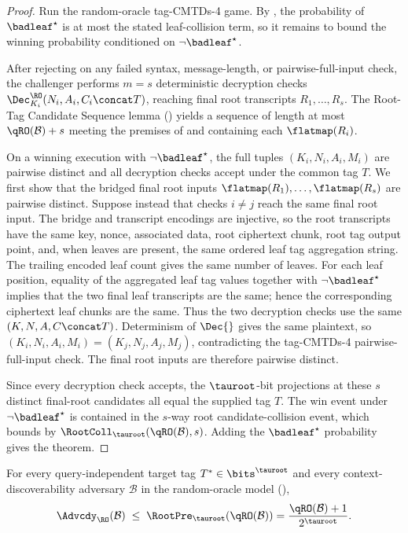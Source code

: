 \begin{proof}
Run the random-oracle tag-CMTDs-4 game. By
, the probability of
$\badleaf^\star$ is at most the stated leaf-collision term, so it
remains to bound the winning probability conditioned on
$\neg\badleaf^\star$.

After rejecting on any failed syntax, message-length, or
pairwise-full-input check, the challenger performs $m = s$ deterministic
decryption checks $\Dec_{K_i}^{\RO}(N_i,A_i,C_i \concat T)$, reaching
final root transcripts $R_1,\dots,R_s$. The Root-Tag Candidate Sequence
lemma () yields a sequence of length at most
$\qRO(\mathcal{B})+s$ meeting the premises of
 and containing each
$\flatmap(R_i)$.

On a winning execution with $\neg\badleaf^\star$, the full tuples
$(K_i,N_i,A_i,M_i)$ are pairwise distinct and all decryption checks
accept under the common tag $T$. We first show that the bridged final
root inputs $\flatmap(R_1),\dots,\flatmap(R_s)$ are pairwise distinct.
Suppose instead that checks $i \neq j$ reach the same final root input.
The bridge and transcript encodings are injective, so the root
transcripts have the same key, nonce, associated data, root ciphertext
chunk, root tag output point, and, when leaves are present, the same
ordered leaf tag aggregation string. The trailing encoded leaf count
gives the same number of leaves. For each leaf position, equality of the
aggregated leaf tag values together with $\neg\badleaf^\star$ implies
that the two final leaf transcripts are the same; hence the
corresponding ciphertext leaf chunks are the same. Thus the two
decryption checks use the same $(K,N,A,C\concat T)$. Determinism of
$\Dec{}$ gives the same plaintext, so
$(K_i,N_i,A_i,M_i)=(K_j,N_j,A_j,M_j)$, contradicting the tag-CMTDs-4
pairwise-full-input check. The final root inputs are therefore
pairwise distinct.

Since every decryption check accepts, the $\tauroot$-bit projections at
these $s$ distinct final-root candidates all equal the supplied tag
$T$. The win event under $\neg\badleaf^\star$ is contained in the
$s$-way root candidate-collision event, which
 bounds by
$\RootColl_{\tauroot}(\qRO(\mathcal{B}),s)$. Adding the
$\badleaf^\star$ probability gives the theorem.
\end{proof}

\begin{theorem}
\label{thm:cdy-ro}
For every query-independent target tag $T^* \in \bits^{\tauroot}$ and
every context-discoverability adversary $\mathcal{B}$ in the \TW{}
random-oracle model (),
\[
  \Advcdy_\RO(\mathcal{B})
  \;\leq\; \RootPre_{\tauroot}(\qRO(\mathcal{B}))
  = \frac{\qRO(\mathcal{B}) + 1}{2^{\tauroot}}.
\]
\end{theorem}

